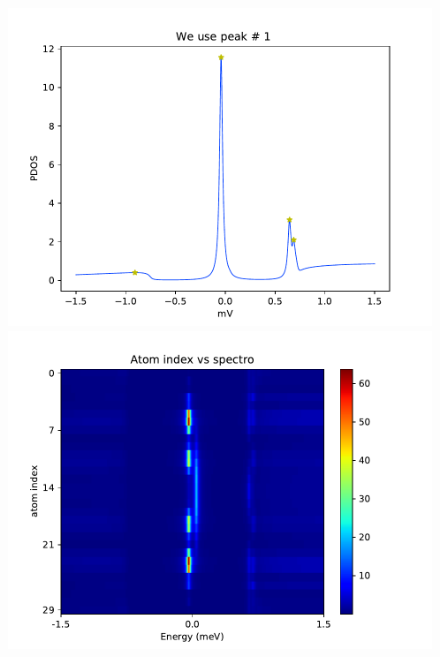 \documentclass[letterpaper,12pt]{article}
\begin{document}
\begin{figure}[h!]
    \centering
    \includegraphics[scale = .5]{spectro_U.pdf}
    \includegraphics[scale = .5]{map_U.pdf}
    

\end{figure}
\end{document}
